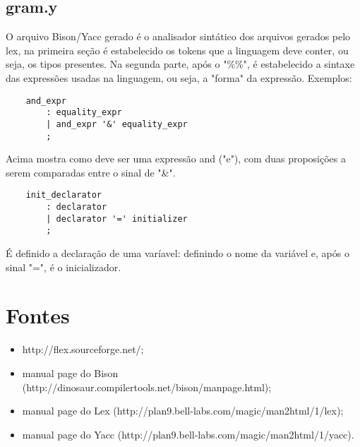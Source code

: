 \documentclass{article}
\begin{document}
\subsection*{gram.y}
    O arquivo Bison/Yacc gerado é o analisador sintático dos arquivos gerados pelo lex, na primeira seção é estabelecido os tokens que a linguagem deve conter, ou seja, os tipos presentes. Na segunda parte, após o "\%\%", é estabelecido a sintaxe das expressões usadas na linguagem, ou seja, a "forma" da expressão. Exemplos:
\begin{verbatim}
    and_expr
        : equality_expr
        | and_expr '&' equality_expr
        ;
\end{verbatim}
    Acima mostra como deve ser uma expressão and ("e"), com duas proposições a serem comparadas entre o sinal de "\&".
\begin{verbatim}
    init_declarator
        : declarator
        | declarator '=' initializer
        ;
\end{verbatim}
    É definido a declaração de uma varíavel: definindo o nome da variável e, após o sinal "=", é o inicializador.
    
\section*{Fontes}
\begin{itemize}
    \item http://flex.sourceforge.net/;
    \item manual page do Bison (http://dinosaur.compilertools.net/bison/manpage.html);
    \item manual page do Lex (http://plan9.bell-labs.com/magic/man2html/1/lex);
    \item manual page do Yacc (http://plan9.bell-labs.com/magic/man2html/1/yacc).
\end{itemize}
\end{document}
